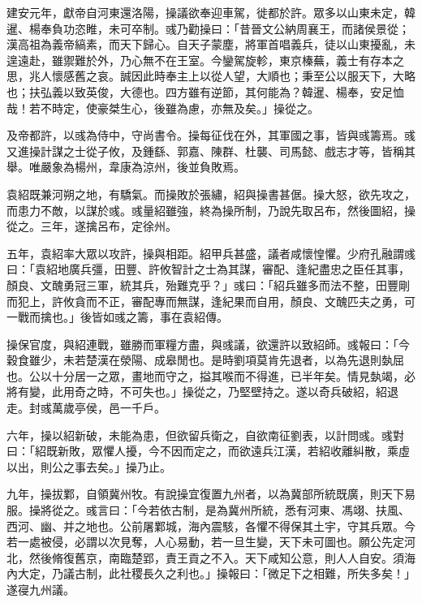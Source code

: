 \begin{pinyinscope}
建安元年，獻帝自河東還洛陽，操議欲奉迎車駕，徙都於許。眾多以山東未定，韓暹、楊奉負功恣睢，未可卒制。彧乃勸操曰：「昔晉文公納周襄王，而諸侯景從；漢高祖為義帝縞素，而天下歸心。自天子蒙塵，將軍首唱義兵，徒以山東擾亂，未遑遠赴，雖禦難於外，乃心無不在王室。今鑾駕旋軫，東京榛蕪，義士有存本之思，兆人懷感舊之哀。誠因此時奉主上以從人望，大順也；秉至公以服天下，大略也；扶弘義以致英俊，大德也。四方雖有逆節，其何能為？韓暹、楊奉，安足恤哉！若不時定，使豪桀生心，後雖為慮，亦無及矣。」操從之。

及帝都許，以彧為侍中，守尚書令。操每征伐在外，其軍國之事，皆與彧籌焉。彧又進操計謀之士從子攸，及鍾繇、郭嘉、陳群、杜襲、司馬懿、戲志才等，皆稱其舉。唯嚴象為楊州，韋康為涼州，後並負敗焉。

袁紹既兼河朔之地，有驕氣。而操敗於張繡，紹與操書甚倨。操大怒，欲先攻之，而患力不敵，以謀於彧。彧量紹雖強，終為操所制，乃說先取呂布，然後圖紹，操從之。三年，遂擒呂布，定徐州。

五年，袁紹率大眾以攻許，操與相距。紹甲兵甚盛，議者咸懷惶懼。少府孔融謂彧曰：「袁紹地廣兵彊，田豐、許攸智計之士為其謀，審配、逢紀盡忠之臣任其事，顏良、文醜勇冠三軍，統其兵，殆難克乎？」彧曰：「紹兵雖多而法不整，田豐剛而犯上，許攸貪而不正，審配專而無謀，逢紀果而自用，顏良、文醜匹夫之勇，可一戰而擒也。」後皆如彧之籌，事在袁紹傳。

操保官度，與紹連戰，雖勝而軍糧方盡，與彧議，欲還許以致紹師。彧報曰：「今穀食雖少，未若楚漢在滎陽、成皋閒也。是時劉項莫肯先退者，以為先退則埶屈也。公以十分居一之眾，畫地而守之，搤其喉而不得進，已半年矣。情見埶竭，必將有變，此用奇之時，不可失也。」操從之，乃堅壁持之。遂以奇兵破紹，紹退走。封彧萬歲亭侯，邑一千戶。

六年，操以紹新破，未能為患，但欲留兵衛之，自欲南征劉表，以計問彧。彧對曰：「紹既新敗，眾懼人擾，今不因而定之，而欲遠兵江漢，若紹收離糾散，乘虛以出，則公之事去矣。」操乃止。

九年，操拔鄴，自領冀州牧。有說操宜復置九州者，以為冀部所統既廣，則天下易服。操將從之。彧言曰：「今若依古制，是為冀州所統，悉有河東、馮翊、扶風、西河、幽、并之地也。公前屠鄴城，海內震駭，各懼不得保其土宇，守其兵眾。今若一處被侵，必謂以次見奪，人心易動，若一旦生變，天下未可圖也。願公先定河北，然後脩復舊京，南臨楚郢，責王貢之不入。天下咸知公意，則人人自安。須海內大定，乃議古制，此社稷長久之利也。」操報曰：「微足下之相難，所失多矣！」遂寑九州議。


\end{pinyinscope}

